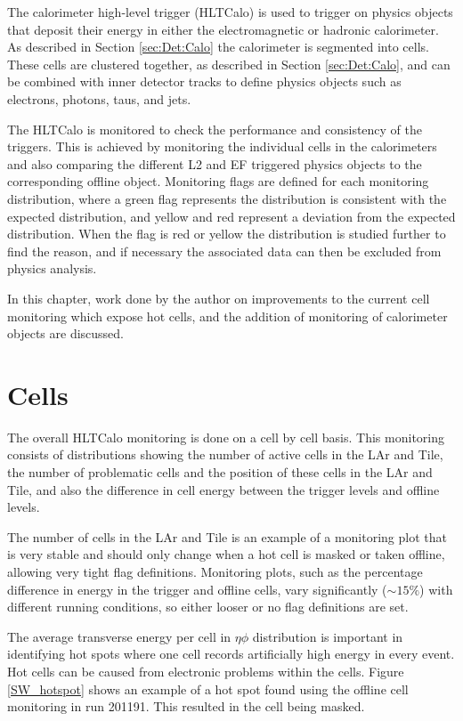 The calorimeter high-level trigger (HLTCalo) is used to trigger on physics objects that deposit their energy in either the electromagnetic or hadronic calorimeter.
As described in Section \ref{sec:Det:Calo} the calorimeter is segmented into cells.
These cells are clustered together, as described in Section \ref{sec:Det:Calo}, and can be combined with inner detector tracks to define physics objects such as electrons, photons, taus, and jets. 

The HLTCalo is monitored to check the performance and consistency of the triggers. 
This is achieved by monitoring the individual cells in the calorimeters and also comparing the different L2 and EF triggered physics objects to the corresponding offline object.
Monitoring flags are defined for each monitoring distribution, where a green flag represents the distribution is consistent with the expected distribution, and yellow and red represent a deviation from the expected distribution. 
When the flag is red or yellow the distribution is studied further to find the reason, and if necessary the associated data can then be excluded from physics analysis.


In this chapter, work done by the author on improvements to the current cell monitoring which expose hot cells, and the addition of monitoring of calorimeter objects are discussed. 

\section{Cells}

The overall HLTCalo monitoring is done on a cell by cell basis.
This monitoring consists of distributions showing the number of active cells in the LAr and Tile, the number of problematic cells and the position of these cells in the LAr and Tile, and also the difference in cell energy between the trigger levels and offline levels.

The number of cells in the LAr and Tile is an example of a monitoring plot that is very stable and  should only change when a hot cell is masked or taken offline, allowing very tight flag definitions.
Monitoring plots, such as the percentage difference in energy in the trigger and offline cells, vary significantly ($\sim15\%$) with different running conditions, so either looser or no flag definitions are set.

The average transverse energy per cell in $\eta  \phi$ distribution is important in identifying hot spots where one cell records artificially high energy in every event.
Hot cells can be caused from electronic problems within the cells. 
Figure \ref{SW_hotspot} shows an example of a hot spot found using the offline cell monitoring in run 201191. 
This resulted in the cell being masked.

